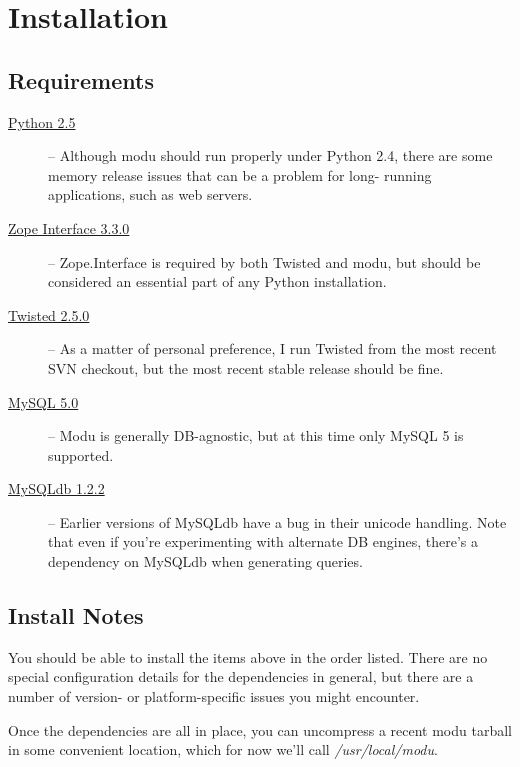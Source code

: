 \chapter{Installation}

\section{Requirements}

\begin{flushleft}
\begin{description}
    \item[\href{http://www.python.org}{Python 2.5}]
        -- Although modu should run properly under Python 2.4,
        there are some memory release issues that can be a problem for long-
        running applications, such as web servers.
    \item[\href{http://www.zope.org/Products/ZopeInterface}{Zope Interface 3.3.0}]
        -- Zope.Interface is required by both Twisted
        and modu, but should be considered an essential part of any Python
        installation.
    \item[\href{http://www.twistedmatrix.com}{Twisted 2.5.0}]
        -- As a matter of personal preference, I run Twisted
        from the most recent SVN checkout, but the most recent stable release
        should be fine.
    \item[\href{http://www.mysql.com}{MySQL 5.0}]
        -- Modu is generally DB-agnostic, but at this time only
        MySQL 5 is supported.
    \item[\href{http://sourceforge.net/projects/mysql-python}{MySQLdb 1.2.2}]
        -- Earlier versions of MySQLdb have a bug in their
        unicode handling. Note that even if you're experimenting with alternate
        DB engines, there's a dependency on MySQLdb when generating queries.
\end{description}
\end{flushleft}

\section{Install Notes}

You should be able to install the items above in the order listed. There are
no special configuration details for the dependencies in general, but there
are a number of version- or platform-specific issues you might encounter.

Once the dependencies are all in place, you can uncompress a recent modu
tarball in some convenient location, which for now we'll call \emph{/usr/local/modu}.

